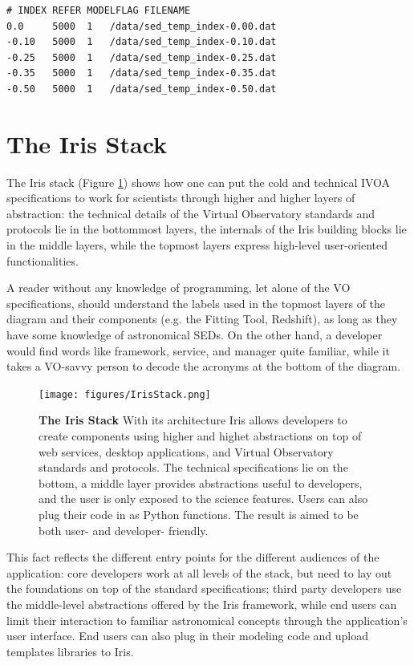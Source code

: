 \documentclass[5p]{elsarticle}
\begin{document}
\begin{lstlisting}[style=code,
	caption=Example of template library definition file,
	label=lst:templateconfig]
# INDEX REFER MODELFLAG FILENAME
0.0     5000  1   /data/sed_temp_index-0.00.dat
-0.10   5000  1   /data/sed_temp_index-0.10.dat
-0.25   5000  1   /data/sed_temp_index-0.25.dat
-0.35   5000  1   /data/sed_temp_index-0.35.dat
-0.50   5000  1   /data/sed_temp_index-0.50.dat
\end{lstlisting}


\section{The Iris Stack}
\label{sec:stack}

The Iris stack (Figure \ref{fig:stack}) shows how one can put the cold and technical IVOA specifications to work for scientists through higher and higher layers of abstraction: the technical details of the Virtual Observatory standards and protocols lie in the bottommost layers, the internals of the Iris building blocks lie in the middle layers, while the topmost layers express high-level user-oriented functionalities.

A reader without any knowledge of programming, let alone of the VO specifications, should understand the labels used in the topmost layers of the diagram and their components (e.g. the Fitting Tool, Redshift), as long as they have some knowledge of astronomical SEDs. On the other hand, a developer would find words like framework, service, and manager quite familiar, while it takes a VO-savvy person to decode the acronyms at the bottom of the diagram.

\begin{figure}
\label{fig:stack}
\begin{center}
\texttt{[image: figures/IrisStack.png]}
\caption{\textbf{The Iris Stack} With its architecture Iris allows developers to create components using higher and highet abstractions on top of web services, desktop applications, and Virtual Observatory standards and protocols. The technical specifications lie on the bottom, a middle layer provides abstractions useful to developers, and the user is only exposed to the science features. Users can also plug their code in as Python functions. The result is aimed to be both user- and developer- friendly.}
\end{center}
\end{figure}

This fact reflects the different entry points for the different audiences of the application: core developers work at all levels of the stack, but need to lay out the foundations on top of the standard specifications; third party developers use the middle-level abstractions offered by the Iris framework, while end users can limit their interaction to familiar astronomical concepts through the application's user interface. End users can also plug in their modeling code and upload templates libraries to Iris.
\end{document}
